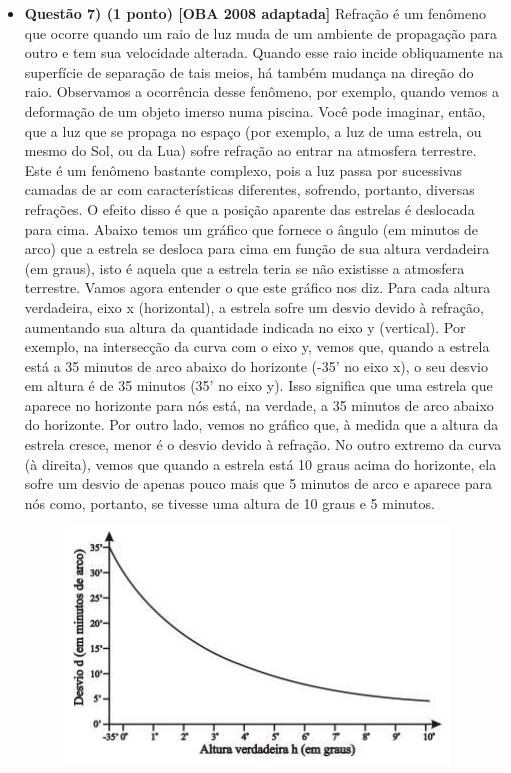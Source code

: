 \documentclass[a4paper, 12pt]{article}
\begin{document}
\begin{flushleft}
\begin{itemize}
            \item \textbf{Questão 7) (1 ponto) [OBA 2008 adaptada]} Refração é um fenômeno que ocorre quando um raio de luz muda de um ambiente de propagação para outro e tem sua velocidade alterada. Quando esse raio incide obliquamente na superfície de separação de tais meios, há também mudança na direção do raio. Observamos a ocorrência desse fenômeno, por exemplo, quando vemos a deformação de um objeto imerso numa piscina. Você pode imaginar, então, que a luz que se propaga no espaço (por exemplo, a luz de uma estrela, ou mesmo do Sol, ou da Lua) sofre refração ao entrar na atmosfera terrestre.  Este é um fenômeno bastante complexo, pois a luz passa por sucessivas camadas de ar com características diferentes, sofrendo, portanto, diversas refrações. O efeito disso é que a posição aparente das estrelas é deslocada para cima. \linebreak Abaixo temos um gráfico que fornece o ângulo (em minutos de arco) que a estrela se desloca para cima em função de sua altura verdadeira (em graus), isto é aquela que a estrela teria se não existisse a atmosfera terrestre. Vamos agora entender o que este gráfico nos diz. \linebreak Para cada altura verdadeira, eixo x (horizontal), a estrela sofre um desvio devido à refração, aumentando sua altura da quantidade indicada no eixo y (vertical). Por exemplo, na intersecção da curva com o eixo y, vemos que, quando a estrela está a 35 minutos de arco abaixo do horizonte (-35’ no eixo x), o seu desvio em altura é de 35 minutos (35’ no eixo y). Isso significa que uma estrela que aparece no horizonte para nós está, na verdade, a 35 minutos de arco abaixo do horizonte. Por outro lado, vemos no gráfico que, à medida que a altura da estrela cresce, menor é o desvio devido à refração. No outro extremo da curva (à direita), vemos que quando a estrela está 10 graus acima do horizonte, ela sofre um desvio de apenas pouco mais que 5 minutos de arco e aparece para nós como, portanto, se tivesse uma altura de 10 graus e 5 minutos.
                \begin{figure}[H]
                    \centering
                    \includegraphics[scale=0.75]{img/7.png}

\end{figure}
\end{itemize}
\end{flushleft}
\end{document}
